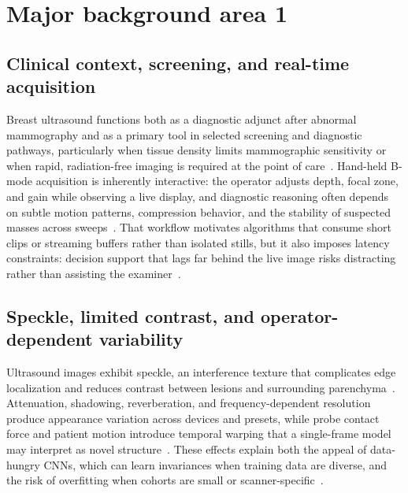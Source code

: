 \documentclass[
english,                 %
bibtex,                  %
]{kththesis}
\numberwithin{listing}{chapter}
\begin{document}
\section{Major background area 1}

\subsection{Clinical context, screening, and real-time acquisition}
Breast ultrasound functions both as a diagnostic adjunct after abnormal mammography and as a primary tool in selected screening and diagnostic pathways, particularly when tissue density limits mammographic sensitivity or when rapid, radiation-free imaging is required at the point of care~\cite{dan2024_breast_us_dl_review,wang2021_ultrasound_dl_review}.
Hand-held B-mode acquisition is inherently interactive: the operator adjusts depth, focal zone, and gain while observing a live display, and diagnostic reasoning often depends on subtle motion patterns, compression behavior, and the stability of suspected masses across sweeps~\cite{chen2021_ceus_domain,lin2022_buv_miccai}.
That workflow motivates algorithms that consume short clips or streaming buffers rather than isolated stills, but it also imposes latency constraints: decision support that lags far behind the live image risks distracting rather than assisting the examiner~\cite{liu2023_edgemednet}.

\subsection{Speckle, limited contrast, and operator-dependent variability}
Ultrasound images exhibit speckle, an interference texture that complicates edge localization and reduces contrast between lesions and surrounding parenchyma~\cite{wang2021_ultrasound_dl_review,dan2024_breast_us_dl_review}.
Attenuation, shadowing, reverberation, and frequency-dependent resolution produce appearance variation across devices and presets, while probe contact force and patient motion introduce temporal warping that a single-frame model may interpret as novel structure~\cite{chen2021_ceus_domain,zhao2023_dynamic_us_video}.
These effects explain both the appeal of data-hungry CNNs, which can learn invariances when training data are diverse, and the risk of overfitting when cohorts are small or scanner-specific~\cite{litjens2017_survey_deep_medical,dan2024_breast_us_dl_review}.
\end{document}
